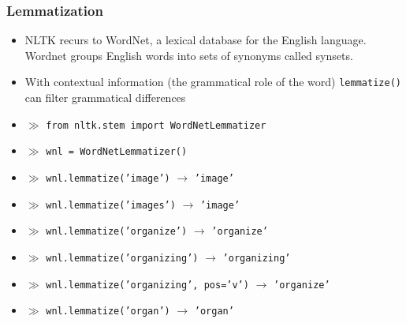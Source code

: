 \documentclass{beamer}
\begin{document}
\begin{frame}

    \frametitle{Lemmatization}
    
    	\begin{block}{}
    	\begin{itemize}
    	\item NLTK recurs to WordNet, a lexical database for the English language. Wordnet groups English words into sets of synonyms called synsets.
    	\item With contextual information (the grammatical role of the word) {\tt lemmatize()} can filter grammatical differences
    	\end{itemize}
    	\end{block}
    	
    	\begin{itemize}
    		\footnotesize
    		\item[] $\gg$ {\tt from nltk.stem import WordNetLemmatizer}
    		\item[] $\gg$ {\tt wnl = WordNetLemmatizer()}
    		\item[] $\gg$ {\tt wnl.lemmatize('image')} $\rightarrow$ {\tt 'image'}
    		\item[] $\gg$ {\tt wnl.lemmatize('images')} $\rightarrow$ {\tt 'image'}
    		\item[] $\gg$ {\tt wnl.lemmatize('organize')} $\rightarrow$ {\tt 'organize'}
    		\item[] $\gg$ {\tt wnl.lemmatize('organizing')} $\rightarrow$ {\tt 'organizing'}
    		\item[] $\gg$ {\tt wnl.lemmatize('organizing', pos='v')} $\rightarrow$ {\tt 'organize'}
    		\item[] $\gg$ {\tt wnl.lemmatize('organ')} $\rightarrow$ {\tt 'organ'}
       	\end{itemize}
    
\end{frame}
\end{document}
